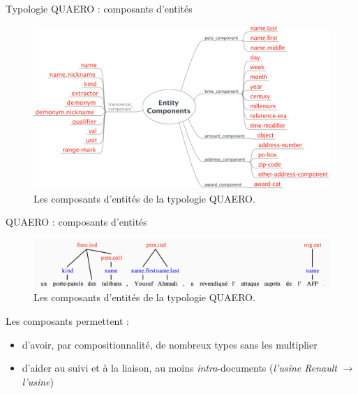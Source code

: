 \documentclass[xetex,xcolor={table,usenames,dvipsnames}]{beamer}
\begin{document}
\begin{frame}{Typologie \textsc{QUAERO} : composants d'entités}
		\begin{figure}[h] %
		\centering
		\includegraphics[width=1\linewidth]{img/quaero_composants_entites.png}
		\caption{Les composants d'entités de la typologie \textsc{QUAERO}.}
		\label{fig:ling_out_TAL}
	\end{figure}
\end{frame}

\begin{frame}{\textsc{QUAERO} : composants d'entités}
			\begin{figure}[h] %
		\centering
		\includegraphics[width=1\linewidth]{img/quaero_composants_entites_2.png}
		\caption{Les composants d'entités de la typologie \textsc{QUAERO}.}
		\label{fig:ling_out_TAL}
	\end{figure}
	
	Les composants permettent : 
	\begin{itemize}
		\item d'avoir, par compositionnalité, de nombreux types sans les multiplier
		\item d'aider au suivi et à la liaison, au moins \textit{intra}-documents (\textit{l'usine Renault} $\rightarrow$ \textit{l'usine})
	\end{itemize}
\end{frame}
\end{document}

